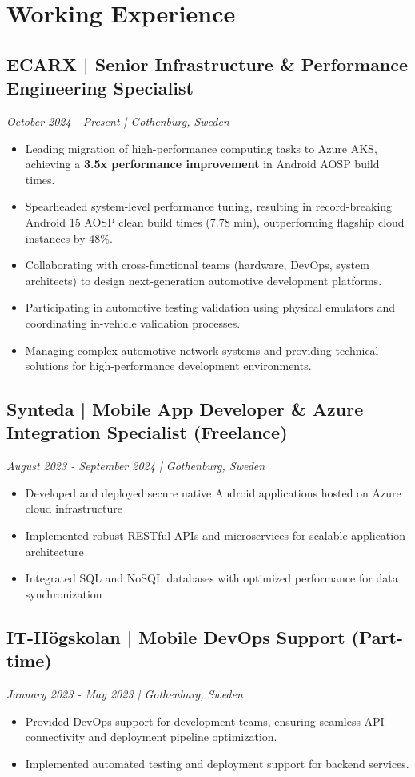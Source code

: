 \documentclass[11pt,a4paper]{article}
\begin{document}
\section*{Working Experience}
\subsection*{ECARX | Senior Infrastructure \& Performance Engineering Specialist}
\textit{October 2024 - Present | Gothenburg, Sweden}
\begin{itemize}[noitemsep]
\item Leading migration of high-performance computing tasks to Azure AKS, achieving a \textbf{3.5x performance improvement} in Android AOSP build times.
\item Spearheaded system-level performance tuning, resulting in record-breaking Android 15 AOSP clean build times (7.78 min), outperforming flagship cloud instances by 48\%.
\item Collaborating with cross-functional teams (hardware, DevOps, system architects) to design next-generation automotive development platforms.
\item Participating in automotive testing validation using physical emulators and coordinating in-vehicle validation processes.
\item Managing complex automotive network systems and providing technical solutions for high-performance development environments.
\end{itemize}

\subsection*{Synteda | Mobile App Developer \& Azure Integration Specialist (Freelance)}
\textit{August 2023 - September 2024 | Gothenburg, Sweden}
\begin{itemize}[noitemsep]
\item Developed and deployed secure native Android applications hosted on Azure cloud infrastructure
\item Implemented robust RESTful APIs and microservices for scalable application architecture
\item Integrated SQL and NoSQL databases with optimized performance for data synchronization
\end{itemize}

\subsection*{IT-Högskolan | Mobile DevOps Support (Part-time)}
\textit{January 2023 - May 2023 | Gothenburg, Sweden}
\begin{itemize}[noitemsep]
\item Provided DevOps support for development teams, ensuring seamless API connectivity and deployment pipeline optimization.
\item Implemented automated testing and deployment support for backend services.
\end{itemize}
\end{document}
